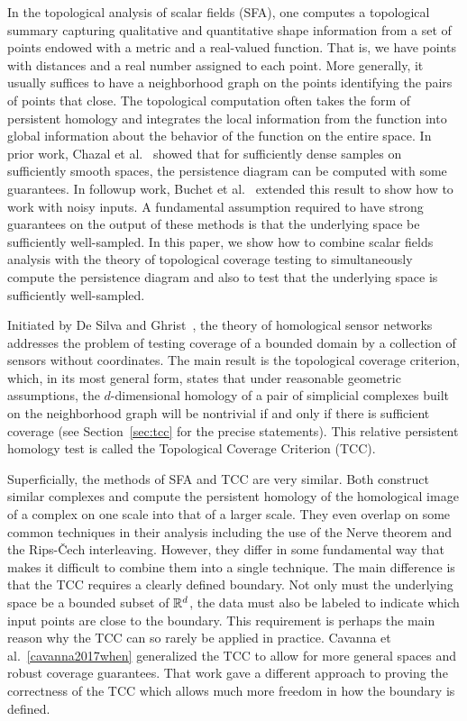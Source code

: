 
In the topological analysis of scalar fields (SFA), one computes a topological summary capturing qualitative and quantitative shape information from a set of points endowed with a metric and a real-valued function.
That is, we have points with distances and a real number assigned to each point.
More generally, it usually suffices to have a neighborhood graph on the points identifying the pairs of points that close.
The topological computation often takes the form of persistent homology and integrates the local information from the function into global information about the behavior of the function on the entire space.
In prior work, Chazal et al.~\cite{chazal09analysis} showed that for sufficiently dense samples on sufficiently smooth spaces, the persistence diagram can be computed with some guarantees.
In followup work, Buchet et al.~\cite{buchet15topological} extended this result to show how to work with noisy inputs.
A fundamental assumption required to have strong guarantees on the output of these methods is that the underlying space be sufficiently well-sampled.
In this paper, we show how to combine scalar fields analysis with the theory of topological coverage testing to simultaneously compute the persistence diagram and also to test that the underlying space is sufficiently well-sampled.

Initiated by De Silva and Ghrist~\cite{desilva06coordinate,desilva07coverage,desilva07homological}, the theory of homological sensor networks addresses the problem of testing coverage of a bounded domain by a collection of sensors without coordinates.
The main result is the topological coverage criterion, which, in its most general form, states that under reasonable geometric assumptions, the $d$-dimensional homology of a pair of simplicial complexes built on the neighborhood graph will be nontrivial if and only if there is sufficient coverage (see Section~\ref{sec:tcc} for the precise statements).
This relative persistent homology test is called the Topological Coverage Criterion (TCC).

Superficially, the methods of SFA and TCC are very similar.
Both construct similar complexes and compute the persistent homology of the homological image of a complex on one scale into that of a larger scale.
They even overlap on some common techniques in their analysis including the use of the Nerve theorem and the Rips-\v{C}ech interleaving.
However, they differ in some fundamental way that makes it difficult to combine them into a single technique.
The main difference is that the TCC requires a clearly defined boundary.
Not only must the underlying space be a bounded subset of $\mathbb{R}^d$, the data must also be labeled to indicate which input points are close to the boundary.
This requirement is perhaps the main reason why the TCC can so rarely be applied in practice.
Cavanna et al.~\ref{cavanna2017when} generalized the TCC to allow for more general spaces and robust coverage guarantees.
That work gave a different approach to proving the correctness of the TCC which allows much more freedom in how the boundary is defined.


